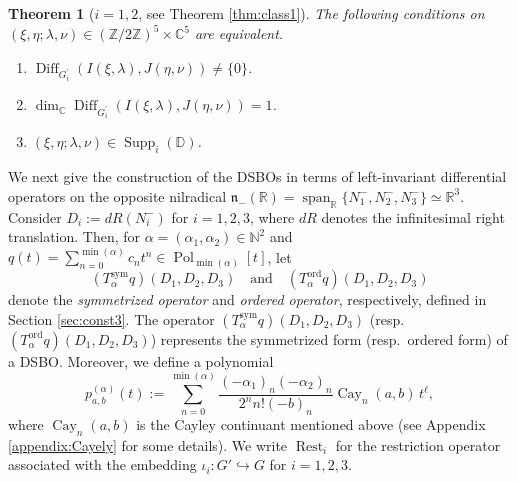 \documentclass[a4paper,11pt,reqno]{amsart}
\newcommand{\frakn}{\mathfrak{n}}
\newcommand{\DD}{\mathbb{D}}
\newcommand{\NN}{\mathbb{N}}
\newcommand{\RR}{\mathbb{R}}
\newcommand{\0}{{\bf 0}}
\newcommand{\Z}{\mathbb{Z}}
\newcommand{\R}{\mathbb{R}}
\newcommand{\C}{\mathbb{C}}
\newcommand{\1}{{\bf 1}}
\DeclareMathOperator{\Cay}{Cay}
\DeclareMathOperator{\Span}{span}
\DeclareMathOperator{\Pol}{Pol}
\newcommand{\ord}{{\mathrm{ord}}}
\DeclareMathOperator{\Supp}{Supp}
\DeclareMathOperator{\Diff}{Diff}
\DeclareMathOperator{\Rest}{Rest}
\theoremstyle{plain}
\newtheorem{thmalph}{Theorem}
\theoremstyle{definition}
\numberwithin{equation}{section}
\theoremstyle{definition}
\begin{document}
\begin{thmalph}[$i=1,2$, see Theorem \ref{thm:class1}]
\label{Intro:C}
The following conditions on $(\xi, \eta; \lambda, \nu) \in (\Z/2\Z)^5 \times \C^5$ are equivalent.
\begin{enumerate}[label = \normalfont{(\roman*)}]
    \item $\Diff_{G_i^\prime}\left(I(\xi, \lambda), J(\eta, \nu)\right) \neq \{0\}$.
    
    \item $\dim_\C \Diff_{G_i^\prime}\left(I(\xi, \lambda), J(\eta, \nu)\right) = 1$.

    \item $(\xi, \eta; \lambda, \nu) \in \Supp_i(\DD)$. 
\end{enumerate}
\end{thmalph}

We next give the construction of the DSBOs in terms of left-invariant differential
operators on the opposite nilradical $\frakn_-(\R)=\Span_\R\{N_1^-,N_2^-,N_3^-\} \simeq \RR^3$. 
Consider  $D_i:=dR(N_i^-)$ for $i=1,2,3$, where $dR$ denotes the infinitesimal
right translation.
Then, for $\alpha=(\alpha_1,\alpha_2) \in \NN^2$
and 
$q(t)=\sum_{n=0}^{\min(\alpha)}c_n t^n \in \Pol_{\min(\alpha)}[t]$, 
let 
\begin{equation*}
(T^{\mathrm{sym}}_{\alpha} q)(D_1, D_2, D_3)
\quad
\text{and}
\quad
(T^\ord_{\alpha} q)(D_1, D_2, D_3)
\end{equation*}
denote 
the \emph{symmetrized operator} 
and
\emph{ordered operator}, respectively, defined in 
Section \ref{sec:const3}.
The operator
$(T^{\mathrm{sym}}_{\alpha} q)(D_1, D_2, D_3)$
(resp.\ $(T^\ord_{\alpha} q)(D_1, D_2, D_3)$)
represents the symmetrized form (resp.\ ordered form) of a DSBO.
Moreover, we define a polynomial
\begin{equation*}
p^{(\alpha)}_{a,b}(t)
:=\sum_{n=0}^{\min(\alpha)}\frac{(-\alpha_1)_n(-\alpha_2)_n}{2^n n!(-b)_n}
\Cay_n(a,b)\,t^\ell,
\end{equation*}
where $\Cay_n(a,b)$ is
the Cayley continuant mentioned above 
(see Appendix \ref{appendix:Cayely} for some details).
We write $\Rest_i$ for the restriction operator associated with the 
embedding $\iota_i\colon G' \hookrightarrow G$ for $i=1,2,3$.
\end{document}
